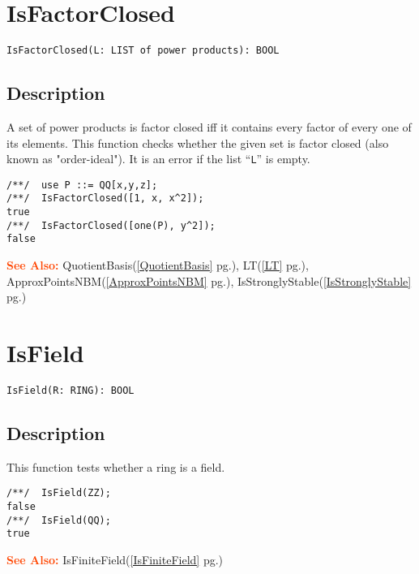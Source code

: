 \documentclass[a4paper]{mybook}
\newenvironment{command}{}{} %
\newcommand\SeeAlso{\par\textcolor{OrangeRed}{\textbf{\large See Also: }}}
\begin{document}
\section{IsFactorClosed}
\label{IsFactorClosed}
\begin{command} %


\begin{Verbatim}[label=syntax, rulecolor=\color{MidnightBlue},
frame=single]
IsFactorClosed(L: LIST of power products): BOOL
\end{Verbatim}


\subsection*{Description}

A set of power products is factor closed iff it contains every factor of
every one of its elements.  This function checks whether the given set
is factor closed (also known as "order-ideal").  It is an error if the
list ``\verb&L&'' is empty.
\begin{Verbatim}[label=example, rulecolor=\color{PineGreen}, frame=single]
/**/  use P ::= QQ[x,y,z];
/**/  IsFactorClosed([1, x, x^2]);
true
/**/  IsFactorClosed([one(P), y^2]);
false
\end{Verbatim}


\SeeAlso %
  QuotientBasis(\ref{QuotientBasis} pg.\pageref{QuotientBasis}), 
    LT(\ref{LT} pg.\pageref{LT}), 
    ApproxPointsNBM(\ref{ApproxPointsNBM} pg.\pageref{ApproxPointsNBM}), 
    IsStronglyStable(\ref{IsStronglyStable} pg.\pageref{IsStronglyStable})
\end{command} %

\section{IsField}
\label{IsField}
\begin{command} %


\begin{Verbatim}[label=syntax, rulecolor=\color{MidnightBlue},
frame=single]
IsField(R: RING): BOOL
\end{Verbatim}


\subsection*{Description}

This function tests whether a ring is a field.
\begin{Verbatim}[label=example, rulecolor=\color{PineGreen}, frame=single]
/**/  IsField(ZZ);
false
/**/  IsField(QQ);
true
\end{Verbatim}


\SeeAlso %
  IsFiniteField(\ref{IsFiniteField} pg.\pageref{IsFiniteField})
\end{command} %
\end{document}
